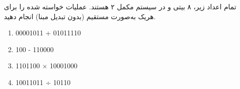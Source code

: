

تمام اعداد زیر، ۸ بیتی و در سیستم مکمل ۲ هستند. عملیات خواسته شده را برای هریک به‌صورت مستقیم (بدون تبدیل مبنا) انجام دهید.

\begin{latin}
	\begin{enumerate}
			\item 
			00001011 + 01011110
			
			\item 
			100 - 110000
			
			\item 
			1101100 $\times$ 10001000
			
			\item 
			10011011 ÷ 10110
		\end{enumerate}
\end{latin}